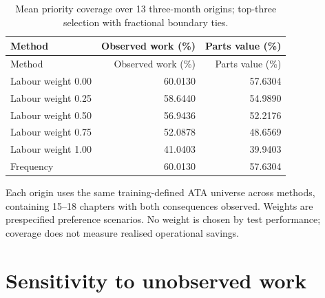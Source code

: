 \begin{small}

\setlength{\tabcolsep}{4pt}

\begin{longtable}{lrr}

\caption{Mean priority coverage over 13 three-month origins; top-three selection with fractional boundary ties.}\label{tab:s-priorities}\\

\toprule

Method & Observed work (\%) & Parts value (\%) \\

\midrule

\endfirsthead

\toprule

Method & Observed work (\%) & Parts value (\%) \\

\midrule

\endhead

Labour weight 0.00 & 60.0130 & 57.6304 \\

Labour weight 0.25 & 58.6440 & 54.9890 \\

Labour weight 0.50 & 56.9436 & 52.2176 \\

Labour weight 0.75 & 52.0878 & 48.6569 \\

Labour weight 1.00 & 41.0403 & 39.9403 \\

Frequency & 60.0130 & 57.6304 \\

\bottomrule

\end{longtable}

\end{small}

Each origin uses the same training-defined ATA universe across methods, containing 15--18 chapters with both consequences observed. Weights are prespecified preference scenarios. No weight is chosen by test performance; coverage does not measure realised operational savings.

\section{Sensitivity to unobserved work}

